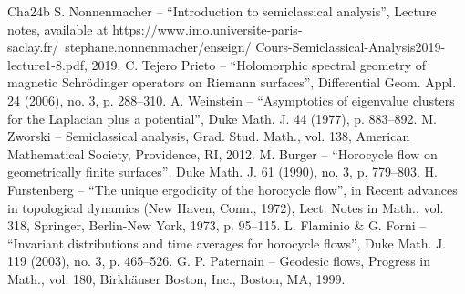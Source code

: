 \documentclass[10pt,a4paper]{amsart}
\theoremstyle{plain}
\theoremstyle{definition}
\begin{document}
\begin{thebibliography}{Cha24b}
 S. Nonnenmacher – “Introduction to semiclassical analysis”, Lecture notes, available at https://www.imo.universite-paris-saclay.fr/~stephane.nonnenmacher/enseign/ Cours-Semiclassical-Analysis2019-lecture1-8.pdf, 2019.
 C. Tejero Prieto – “Holomorphic spectral geometry of magnetic Schrödinger operators on Riemann surfaces”, Differential Geom. Appl. 24 (2006), no. 3, p. 288–310.
 A. Weinstein – “Asymptotics of eigenvalue clusters for the Laplacian plus a potential”, Duke Math. J. 44 (1977), p. 883–892.
 M. Zworski – Semiclassical analysis, Grad. Stud. Math., vol. 138, American Mathematical Society, Providence, RI, 2012.
 M. Burger – “Horocycle flow on geometrically finite surfaces”, Duke Math. J. 61 (1990), no. 3, p. 779–803.
 H. Furstenberg – “The unique ergodicity of the horocycle flow”, in Recent advances in topological dynamics (New Haven, Conn., 1972), Lect. Notes in Math., vol. 318, Springer, Berlin-New York, 1973, p. 95–115.
 L. Flaminio \& G. Forni – “Invariant distributions and time averages for horocycle flows”, Duke Math. J. 119 (2003), no. 3, p. 465–526.
 G. P. Paternain – Geodesic flows, Progress in Math., vol. 180, Birkhäuser Boston, Inc., Boston, MA, 1999.
\end{thebibliography}
\end{document}
